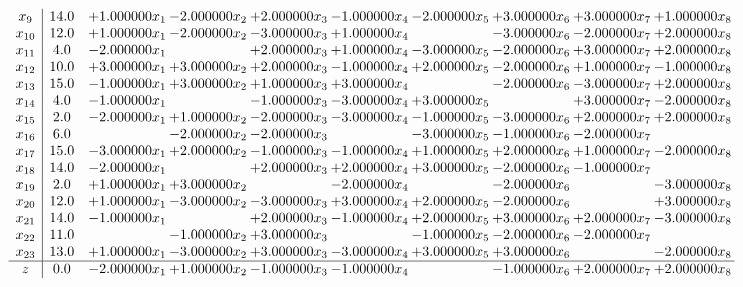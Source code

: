 \documentclass[10pt]{article}
\begin{document}
\[\begin{array}{c| c c@{\hskip 2pt} c@{\hskip 2pt} c@{\hskip 2pt} c@{\hskip 2pt} c@{\hskip 2pt} c@{\hskip 2pt} c@{\hskip 2pt} c@{\hskip 2pt} }
 x_{9}   &  14.0 & + 1.000000 x_{1} & -2.000000 x_{2} & + 2.000000 x_{3} & -1.000000 x_{4} & -2.000000 x_{5} & + 3.000000 x_{6} & + 3.000000 x_{7} & + 1.000000 x_{8}\\
 x_{10}   &  12.0 & + 1.000000 x_{1} & -2.000000 x_{2} & -3.000000 x_{3} & + 1.000000 x_{4} &   & -3.000000 x_{6} & -2.000000 x_{7} & + 2.000000 x_{8}\\
 x_{11}   &  4.0 & -2.000000 x_{1} &   & + 2.000000 x_{3} & + 1.000000 x_{4} & -3.000000 x_{5} & -2.000000 x_{6} & + 3.000000 x_{7} & + 2.000000 x_{8}\\
 x_{12}   &  10.0 & + 3.000000 x_{1} & + 3.000000 x_{2} & + 2.000000 x_{3} & -1.000000 x_{4} & + 2.000000 x_{5} & -2.000000 x_{6} & + 1.000000 x_{7} & -1.000000 x_{8}\\
 x_{13}   &  15.0 & -1.000000 x_{1} & + 3.000000 x_{2} & + 1.000000 x_{3} & + 3.000000 x_{4} &   & -2.000000 x_{6} & -3.000000 x_{7} & + 2.000000 x_{8}\\
 x_{14}   &  4.0 & -1.000000 x_{1} &   & -1.000000 x_{3} & -3.000000 x_{4} & + 3.000000 x_{5} &   & + 3.000000 x_{7} & -2.000000 x_{8}\\
 x_{15}   &  2.0 & -2.000000 x_{1} & + 1.000000 x_{2} & -2.000000 x_{3} & -3.000000 x_{4} & -1.000000 x_{5} & -3.000000 x_{6} & + 2.000000 x_{7} & + 2.000000 x_{8}\\
 x_{16}   &  6.0  &   & -2.000000 x_{2} & -2.000000 x_{3} &   & -3.000000 x_{5} & -1.000000 x_{6} & -2.000000 x_{7} &   \\
 x_{17}   &  15.0 & -3.000000 x_{1} & + 2.000000 x_{2} & -1.000000 x_{3} & -1.000000 x_{4} & + 1.000000 x_{5} & + 2.000000 x_{6} & + 1.000000 x_{7} & -2.000000 x_{8}\\
 x_{18}   &  14.0 & -2.000000 x_{1} &   & + 2.000000 x_{3} & + 2.000000 x_{4} & + 3.000000 x_{5} & -2.000000 x_{6} & -1.000000 x_{7} &   \\
 x_{19}   &  2.0 & + 1.000000 x_{1} & + 3.000000 x_{2} &   & -2.000000 x_{4} &   & -2.000000 x_{6} &   & -3.000000 x_{8}\\
 x_{20}   &  12.0 & + 1.000000 x_{1} & -3.000000 x_{2} & -3.000000 x_{3} & + 3.000000 x_{4} & + 2.000000 x_{5} & -2.000000 x_{6} &   & + 3.000000 x_{8}\\
 x_{21}   &  14.0 & -1.000000 x_{1} &   & + 2.000000 x_{3} & -1.000000 x_{4} & + 2.000000 x_{5} & + 3.000000 x_{6} & + 2.000000 x_{7} & -3.000000 x_{8}\\
 x_{22}   &  11.0  &   & -1.000000 x_{2} & + 3.000000 x_{3} &   & -1.000000 x_{5} & -2.000000 x_{6} & -2.000000 x_{7} &   \\
 x_{23}   &  13.0 & + 1.000000 x_{1} & -3.000000 x_{2} & + 3.000000 x_{3} & -3.000000 x_{4} & + 3.000000 x_{5} & + 3.000000 x_{6} &   & -2.000000 x_{8}\\
\hline
z    &  0.0 & -2.000000 x_{1} & + 1.000000 x_{2} & -1.000000 x_{3} & -1.000000 x_{4} &   & -1.000000 x_{6} & + 2.000000 x_{7} & + 2.000000 x_{8}\\
\end{array}\]
\end{document}

